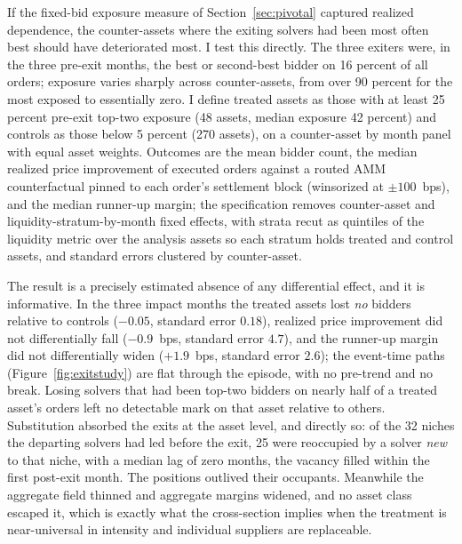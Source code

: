 \documentclass[11pt]{article}
\theoremstyle{plain}
\theoremstyle{definition}
\theoremstyle{remark}
\begin{document}
If the fixed-bid exposure measure of Section~\ref{sec:pivotal} captured realized dependence, the counter-assets where the exiting solvers had been most often best should have deteriorated most. I test this directly. The three exiters were, in the three pre-exit months, the best or second-best bidder on 16 percent of all orders; exposure varies sharply across counter-assets, from over 90 percent for the most exposed to essentially zero. I define treated assets as those with at least 25 percent pre-exit top-two exposure (48 assets, median exposure 42 percent) and controls as those below 5 percent (270 assets), on a counter-asset by month panel with equal asset weights. Outcomes are the mean bidder count, the median realized price improvement of executed orders against a routed AMM counterfactual pinned to each order's settlement block (winsorized at $\pm 100$~bps), and the median runner-up margin; the specification removes counter-asset and liquidity-stratum-by-month fixed effects, with strata recut as quintiles of the liquidity metric over the analysis assets so each stratum holds treated and control assets, and standard errors clustered by counter-asset.

The result is a precisely estimated absence of any differential effect, and it is informative. In the three impact months the treated assets lost \emph{no} bidders relative to controls ($-0.05$, standard error $0.18$), realized price improvement did not differentially fall ($-0.9$~bps, standard error $4.7$), and the runner-up margin did not differentially widen ($+1.9$~bps, standard error $2.6$); the event-time paths (Figure~\ref{fig:exitstudy}) are flat through the episode, with no pre-trend and no break. Losing solvers that had been top-two bidders on nearly half of a treated asset's orders left no detectable mark on that asset relative to others. Substitution absorbed the exits at the asset level, and directly so: of the 32 niches the departing solvers had led before the exit, 25 were reoccupied by a solver \emph{new} to that niche, with a median lag of zero months, the vacancy filled within the first post-exit month. The positions outlived their occupants. Meanwhile the aggregate field thinned and aggregate margins widened, and no asset class escaped it, which is exactly what the cross-section implies when the treatment is near-universal in intensity and individual suppliers are replaceable.
\end{document}
